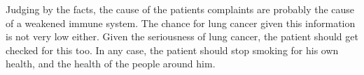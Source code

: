 \documentclass[12pt, a4paper]{article}
\begin{document}
Judging by the facts, the cause of the patients complaints are probably the cause of a weakened immune system. The chance for lung cancer given this information is not very low either. Given the seriousness of lung cancer, the patient should get checked for this too. In any case, the patient should stop smoking for his own health, and the health of the people around him.
\end{document}
